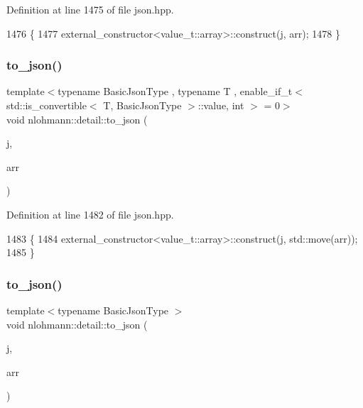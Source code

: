 Definition at line 1475 of file json.\+hpp.


\begin{DoxyCode}
1476 \{
1477     external\_constructor<value\_t::array>::construct(j, arr);
1478 \}
\end{DoxyCode}
\mbox{\label{namespacenlohmann_1_1detail_afd18898316e9a20a6458877d2ee27d31}} 
\subsubsection{\texorpdfstring{to\+\_\+json()}{to\_json()}\hspace{0.1cm}{\footnotesize\ttfamily [10/16]}}
{\footnotesize\ttfamily template$<$typename Basic\+Json\+Type , typename T , enable\+\_\+if\+\_\+t$<$ std\+::is\+\_\+convertible$<$ T, Basic\+Json\+Type $>$\+::value, int $>$  = 0$>$ \\
void nlohmann\+::detail\+::to\+\_\+json (\begin{DoxyParamCaption}\item[{Basic\+Json\+Type \&}]{j,  }\item[{std\+::valarray$<$ T $>$}]{arr }\end{DoxyParamCaption})}



Definition at line 1482 of file json.\+hpp.


\begin{DoxyCode}
1483 \{
1484     external\_constructor<value\_t::array>::construct(j, std::move(arr));
1485 \}
\end{DoxyCode}
\mbox{\label{namespacenlohmann_1_1detail_aa0fd1b5788e9ba37e31da43dda738cb5}} 
\subsubsection{\texorpdfstring{to\+\_\+json()}{to\_json()}\hspace{0.1cm}{\footnotesize\ttfamily [11/16]}}
{\footnotesize\ttfamily template$<$typename Basic\+Json\+Type $>$ \\
void nlohmann\+::detail\+::to\+\_\+json (\begin{DoxyParamCaption}\item[{Basic\+Json\+Type \&}]{j,  }\item[{typename Basic\+Json\+Type\+::array\+\_\+t \&\&}]{arr }\end{DoxyParamCaption})}



